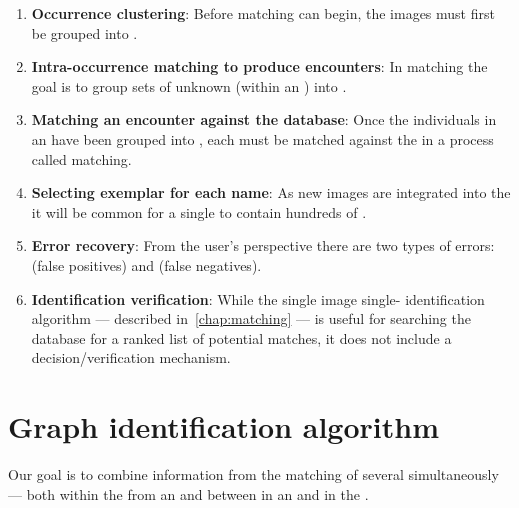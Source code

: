     \begin{enumerate}
        \item \textbf{Occurrence clustering}:
            Before \intraoccurrence{} matching can begin, the images must first be grouped into \occurrences{}.
            
        \item \textbf{Intra-occurrence matching to produce encounters}:
            In \intraoccurrence{} matching the goal is to group sets of
              unknown \annots{} (within an \occurrence{}) into \encounters{}.

        \item \textbf{Matching an encounter against the database}:
            Once the individuals in an \occurrence{} have been grouped into
              \encounters{}, each \encounter{} must be matched against the
              \masterdatabase{} in a process called \vsexemplar{} matching.
            
        \item \textbf{Selecting exemplar \annots{} for each name}:
            As new images are integrated into the \masterdatabase{} it will be
              common for a single \name{} to contain hundreds of \annots{}.
            
        \item \textbf{Error recovery}:
            From the user's perspective there are two types of errors:
             (false positives) and  (false negatives).
            
        \item \textbf{Identification verification}:
            While the single image single-\annot{} identification algorithm
              --- described in~\cref{chap:matching} --- is useful for searching
              the database for a ranked list of potential matches, it does not
              include a decision/verification mechanism.
    \end{enumerate}
    
\section{Graph identification algorithm}
    Our goal is to combine information from the matching of several \annots{} simultaneously --- both within the
      \annots{} from an \occurrence{} and between \annots{} in an \occurrence{} and \annots{} in the \masterdatabase{}.
    
